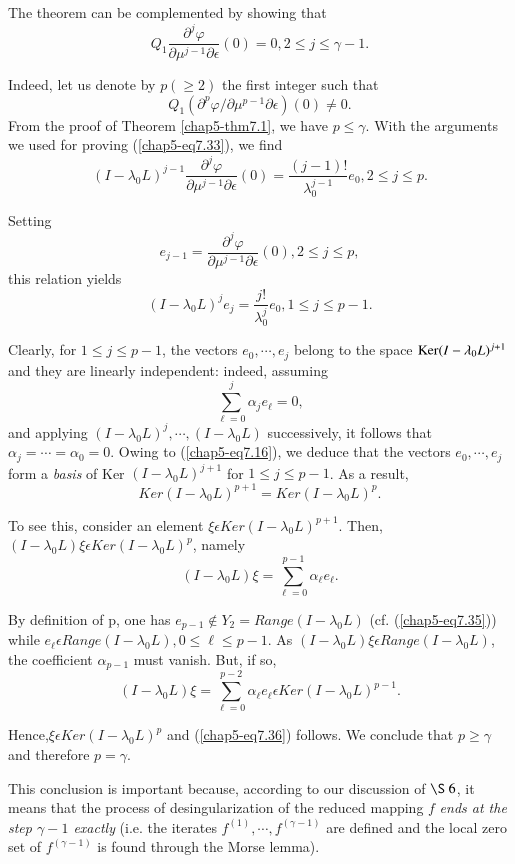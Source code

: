 \begin{remark}\label{chap5-rem7.2}
The theorem can be complemented by showing that
$$
Q_{1} \frac{\partial^{j} \varphi}{\partial \mu^{j-1} \partial
  \epsilon} (0) = 0, 2 \leq j \leq \gamma-1.
$$

Indeed, let us denote by $p(\geq 2)$ the first integer such that
$$Q_{1}(\partial^{p} \varphi / \partial \mu^{p-1} \partial \epsilon)
(0) \neq 0.$$ 
From the proof of Theorem \ref{chap5-thm7.1}, we have $p
\leq \gamma$. With the arguments we used for proving
(\ref{chap5-eq7.33}), we find
$$ 
(I - \lambda_{0}L)^{j-1} \frac{\partial^{j} \varphi}{\partial
  \mu^{j-1} \partial \epsilon} (0) = \frac{(j-1)!}{\lambda_{0}^{j-1}}
e_{0}, 2 \leq j \leq p.
$$

Setting\pageoriginale
\begin{equation*}
e_{j-1} = \frac{\partial^{j} \varphi}{\partial \mu^{j-1} \partial
  \epsilon} (0), 2 \leq j \leq p,\tag{7.35}\label{chap5-eq7.35}
\end{equation*}
this relation yields
$$
(I - \lambda_{0}L)^{j} e_{j} = \frac{j!}{\lambda_{0}^{j}} e_{0}, 1
\leq j \leq p-1.
$$

Clearly, for $1 \leq j \leq p-1$, the vectors $e_{0}, \cdots, e_{j}$
belong to the space $\operatorname{Ker} (I - \lambda_{0}L)^{j+1}$ and they are
linearly independent: indeed, assuming
$$
\sum\limits_{\ell = 0}^{j} \alpha_{j} e_{\ell} = 0,
$$
and applying $(I - \lambda_{0}L)^{j}, \cdots , (I - \lambda_{0}L)$
successively, it follows that $\alpha_{j} = \cdots = \alpha_{0} =
0$. Owing to (\ref{chap5-eq7.16}), we deduce that the vectors $e_{0},
\cdots , e_{j}$ form a {\em basis} of Ker $(I - \lambda_{0}L)^{j+1}$
for $1 \leq j \leq p-1$. As a result,
\begin{equation*}
Ker (I - \lambda_{0}L)^{p+1} = Ker (I - \lambda_{0}L)^{p}.\tag{7.36}\label{chap5-eq7.36}
\end{equation*}

To see this, consider an element $\xi \epsilon Ker (I - \lambda_{0}
L)^{p+1}$. Then, $(I - \lambda_{0}L) \xi \epsilon Ker (I -
\lambda_{0}L)^{p}$, namely
$$
(I - \lambda_{0}L) \xi = \sum\limits_{\ell = 0}^{p-1} \alpha_{\ell} e_{\ell}.
$$

By definition of p, one has $e_{p-1} \notin Y_{2} = Range (I -
\lambda_{0}L)$ (cf. (\ref{chap5-eq7.35})) while $e_{\ell} \epsilon
Range (I - \lambda_{0}L), 0 \leq \ell \leq p-1$. As $(I -
\lambda_{0}L) \xi \epsilon Range (I - \lambda_{0}L)$, the coefficient
$\alpha_{p-1}$ must vanish. But, if so,
$$
(I - \lambda_{0}L)\xi = \sum\limits_{\ell = 0}^{p-2} \alpha_{\ell}
e_{\ell} \epsilon Ker (I - \lambda_{0}L)^{p-1}.
$$

Hence,\pageoriginale $\xi \epsilon Ker (I - \lambda_{0}L)^{p}$ and
(\ref{chap5-eq7.36}) follows. We conclude that $p \geq \gamma$ and
therefore $p = \gamma$.

This conclusion is important because, according to our discussion of
$\S\ 6$, it means that the process of desingularization of the reduced
mapping $f$ {\em ends at the step $\gamma - 1$ exactly} (i.e. the
iterates $f^{(1)}, \cdots, f^{(\gamma - 1)}$ are defined and the local
zero set of $f^{(\gamma - 1)}$ is found through the Morse lemma).
\end{remark}

